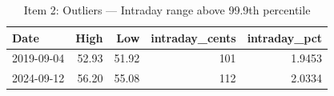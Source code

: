 \begin{table}

\caption{\label{tab:export_latex_tables}Item 2: Outliers — Intraday range above 99.9th percentile}
\centering
\begin{tabular}[t]{lrrrr}
\toprule
Date & High & Low & intraday\_cents & intraday\_pct\\
\midrule
2019-09-04 & 52.93 & 51.92 & 101 & 1.9453\\
2024-09-12 & 56.20 & 55.08 & 112 & 2.0334\\
\bottomrule
\end{tabular}
\end{table}
